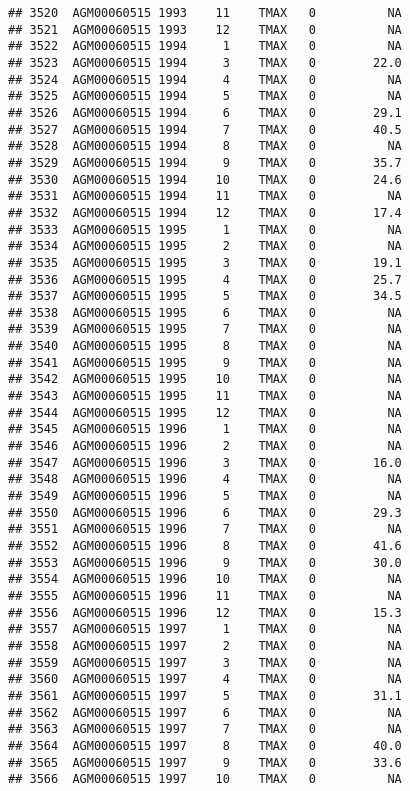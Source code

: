 \documentclass{article}\usepackage[]{graphicx}\usepackage[]{color}
\makeatletter
\newenvironment{kframe}{%
 \def\at@end@of@kframe{}%
 \ifinner\ifhmode%
  \def\at@end@of@kframe{\end{minipage}}%
  \begin{minipage}{\columnwidth}%
 \fi\fi%
 \def\FrameCommand##1{\hskip\@totalleftmargin \hskip-\fboxsep
 \colorbox{shadecolor}{##1}\hskip-\fboxsep
     \hskip-\linewidth \hskip-\@totalleftmargin \hskip\columnwidth}%
 \MakeFramed {\advance\hsize-\width
   \@totalleftmargin\z@ \linewidth\hsize
   \@setminipage}}%
 {\par\unskip\endMakeFramed%
 \at@end@of@kframe}
\newenvironment{knitrout}{}{} %
\makeatother
\begin{document}
\begin{knitrout}
\begin{kframe}
\begin{verbatim}
## 3520  AGM00060515 1993    11    TMAX   0          NA
## 3521  AGM00060515 1993    12    TMAX   0          NA
## 3522  AGM00060515 1994     1    TMAX   0          NA
## 3523  AGM00060515 1994     3    TMAX   0        22.0
## 3524  AGM00060515 1994     4    TMAX   0          NA
## 3525  AGM00060515 1994     5    TMAX   0          NA
## 3526  AGM00060515 1994     6    TMAX   0        29.1
## 3527  AGM00060515 1994     7    TMAX   0        40.5
## 3528  AGM00060515 1994     8    TMAX   0          NA
## 3529  AGM00060515 1994     9    TMAX   0        35.7
## 3530  AGM00060515 1994    10    TMAX   0        24.6
## 3531  AGM00060515 1994    11    TMAX   0          NA
## 3532  AGM00060515 1994    12    TMAX   0        17.4
## 3533  AGM00060515 1995     1    TMAX   0          NA
## 3534  AGM00060515 1995     2    TMAX   0          NA
## 3535  AGM00060515 1995     3    TMAX   0        19.1
## 3536  AGM00060515 1995     4    TMAX   0        25.7
## 3537  AGM00060515 1995     5    TMAX   0        34.5
## 3538  AGM00060515 1995     6    TMAX   0          NA
## 3539  AGM00060515 1995     7    TMAX   0          NA
## 3540  AGM00060515 1995     8    TMAX   0          NA
## 3541  AGM00060515 1995     9    TMAX   0          NA
## 3542  AGM00060515 1995    10    TMAX   0          NA
## 3543  AGM00060515 1995    11    TMAX   0          NA
## 3544  AGM00060515 1995    12    TMAX   0          NA
## 3545  AGM00060515 1996     1    TMAX   0          NA
## 3546  AGM00060515 1996     2    TMAX   0          NA
## 3547  AGM00060515 1996     3    TMAX   0        16.0
## 3548  AGM00060515 1996     4    TMAX   0          NA
## 3549  AGM00060515 1996     5    TMAX   0          NA
## 3550  AGM00060515 1996     6    TMAX   0        29.3
## 3551  AGM00060515 1996     7    TMAX   0          NA
## 3552  AGM00060515 1996     8    TMAX   0        41.6
## 3553  AGM00060515 1996     9    TMAX   0        30.0
## 3554  AGM00060515 1996    10    TMAX   0          NA
## 3555  AGM00060515 1996    11    TMAX   0          NA
## 3556  AGM00060515 1996    12    TMAX   0        15.3
## 3557  AGM00060515 1997     1    TMAX   0          NA
## 3558  AGM00060515 1997     2    TMAX   0          NA
## 3559  AGM00060515 1997     3    TMAX   0          NA
## 3560  AGM00060515 1997     4    TMAX   0          NA
## 3561  AGM00060515 1997     5    TMAX   0        31.1
## 3562  AGM00060515 1997     6    TMAX   0          NA
## 3563  AGM00060515 1997     7    TMAX   0          NA
## 3564  AGM00060515 1997     8    TMAX   0        40.0
## 3565  AGM00060515 1997     9    TMAX   0        33.6
## 3566  AGM00060515 1997    10    TMAX   0          NA

\end{verbatim}
\end{kframe}
\end{knitrout}
\end{document}
